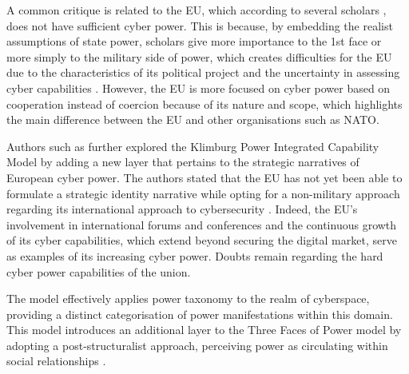 A common critique is related to the EU, which according to several scholars \parencite{kasper_2021_the, klimburg_2011_cybersecurity, sliwinski_2014_moving}, does not have sufficient cyber power. This is because, by embedding the realist assumptions of state power, scholars give more importance to the 1st face or more simply to the military side of power, which creates difficulties for the EU due to the characteristics of its political project and the uncertainty in assessing cyber capabilities \autocite{dunncavelty_2018_europes}. However, the EU is more focused on cyber power based on cooperation instead of coercion because of its nature and scope, which highlights the main difference between the EU and other organisations such as NATO. 

Authors such as \textcite{kasper_2021_the} further explored the Klimburg Power Integrated Capability Model by adding a new layer that pertains to the strategic narratives of European cyber power. The authors stated that the EU has not yet been able to formulate a strategic identity narrative while opting for a non-military approach regarding its international approach to cybersecurity \autocite[64]{kasper_2021_the}. Indeed, the EU's involvement in international forums and conferences and the continuous growth of its cyber capabilities, which extend beyond securing the digital market, serve as examples of its increasing cyber power. Doubts remain regarding the hard cyber power capabilities of the union. 

The \textcite{betz_2011_cyberspace} model effectively applies \textcite{barnett_2005_power} power taxonomy to the realm of cyberspace, providing a distinct categorisation of power manifestations within this domain. This model introduces an additional layer to the Three Faces of Power model by adopting a post-structuralist approach, perceiving power as circulating within social relationships \autocite{dunncavelty_2018_europes}. 

